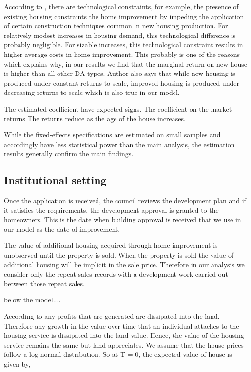 According to \citet{potepan1989interest}, there are technological constraints, for example, the presence of existing housing constraints the home improvement by impeding the application of certain construction techniques common in new housing production. For relatively modest increases in housing demand, this technological difference is probably negligible. For sizable increases, this technological constraint results in higher average costs in home improvement. This probably is one of the reasons which explains why, in our results we find that the marginal return on new house is higher than all other DA types. Author also says that while new housing is produced under constant returns to scale, improved housing is produced under decreasing returns to scale which is also true in our model.



The estimated coefficient have expected signs. The coefficient on the market returns The returns reduce as the age of the house increases. 


While the fixed-effects specifications are estimated on small samples and accordingly have less statistical power than the main analysis, the estimation results generally confirm
the main findings.


\subsection{Institutional setting}
Once the application is received, the council reviews the development plan and if it satisfies the requirements, the development approval is granted to the homeowners. This is the date when building approval is received that we use in our model as the date of improvement.

The value of additional housing acquired through home improvement is unobserved until the property is sold. When the property is sold the value of additional housing will be implicit in the sale price. Therefore in our analysis we consider only the repeat sales records with a development work carried out between those repeat sales. 




below the model....

According to \citet{combes2016production} any profits that are generated are dissipated into the land. Therefore any growth in the value over time that an individual attaches to the housing service is dissipated into the land value. Hence, the value of the housing service remains the same but land appreciates. We assume that the house prices follow a log-normal distribution. So at T = 0, the expected value of house is given by,

